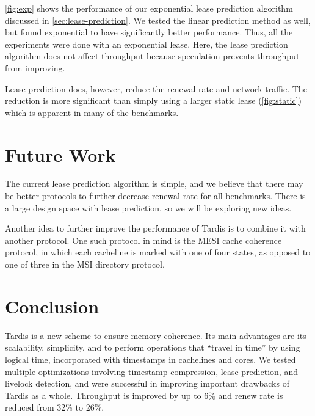 \documentclass[12pt]{article}
\begin{document}
\cref{fig:exp} shows the performance of our exponential lease 
prediction algorithm discussed in \cref{sec:lease-prediction}. We tested the linear prediction method as well, but found exponential to have significantly better performance. Thus, all the experiments were done with an exponential lease.
Here, the lease prediction algorithm does not affect throughput 
because speculation prevents throughput from improving.

Lease prediction does, however, reduce the renewal rate and network 
traffic. The reduction is more significant than simply using a larger 
static lease (\cref{fig:static}) which is apparent in many of the 
benchmarks.

\section{Future Work}

The current lease prediction algorithm is simple, and we believe that 
there may be better protocols to further decrease renewal rate for all 
benchmarks. There is a large design space with lease prediction, so we 
will be exploring new ideas.

Another idea to further improve the performance of Tardis is to 
combine it with another protocol. One such protocol in mind is the 
MESI cache coherence protocol, in which each cacheline is marked with 
one of four states, as opposed to one of three in the MSI directory 
protocol.

\section{Conclusion}

Tardis is a new scheme to ensure memory coherence. Its main advantages 
are its scalability, simplicity, and to perform operations that 
``travel in time'' by using logical time, incorporated with timestamps 
in cachelines and cores. We tested multiple optimizations involving 
timestamp compression, lease prediction, and livelock detection, and 
were successful in improving important drawbacks of Tardis as a whole. Throughput is improved by up to 6\% and renew rate is reduced from 32\% to 26\%.

{
	
	
}
\end{document}
